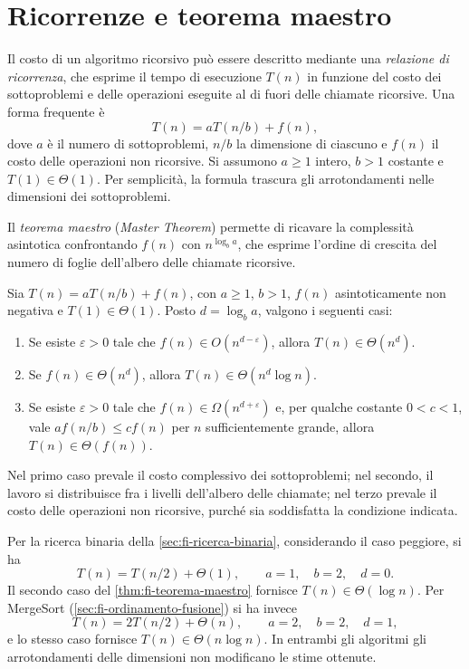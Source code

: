 \section{Ricorrenze e teorema maestro}
\label{sec:fi-teorema-maestro}

Il costo di un algoritmo ricorsivo può essere descritto mediante una
\emph{relazione di ricorrenza}, che esprime il tempo di esecuzione
\(T(n)\) in funzione del costo dei sottoproblemi e delle operazioni
eseguite al di fuori delle chiamate ricorsive. Una forma frequente è
\[
  T(n)=aT(n/b)+f(n),
\]
dove \(a\) è il numero di sottoproblemi, \(n/b\) la dimensione di
ciascuno e \(f(n)\) il costo delle operazioni non ricorsive.
Si assumono \(a\ge1\) intero, \(b>1\) costante e \(T(1)\in\Theta(1)\).
Per semplicità, la formula trascura gli arrotondamenti nelle dimensioni
dei sottoproblemi.

Il \emph{teorema maestro} (\emph{Master Theorem}) permette di
ricavare la complessità asintotica confrontando \(f(n)\) con
\(n^{\log_b a}\), che esprime l'ordine di crescita del numero
di foglie dell'albero delle chiamate ricorsive.

\begin{theorem}
\label{thm:fi-teorema-maestro}
Sia \(T(n)=aT(n/b)+f(n)\), con \(a\ge1\), \(b>1\),
\(f(n)\) asintoticamente non negativa e \(T(1)\in\Theta(1)\).
Posto \(d=\log_b a\), valgono i seguenti casi:
\begin{enumerate}
  \item Se esiste \(\varepsilon>0\) tale che
  \(f(n)\in O(n^{d-\varepsilon})\), allora
  \(T(n)\in\Theta(n^d)\).
  \item Se \(f(n)\in\Theta(n^d)\), allora
  \(T(n)\in\Theta(n^d\log n)\).
  \item Se esiste \(\varepsilon>0\) tale che
  \(f(n)\in\Omega(n^{d+\varepsilon})\) e, per qualche costante
  \(0<c<1\), vale \(af(n/b)\le cf(n)\) per \(n\) sufficientemente
  grande, allora \(T(n)\in\Theta(f(n))\).
\end{enumerate}
\end{theorem}

Nel primo caso prevale il costo complessivo dei sottoproblemi;
nel secondo, il lavoro si distribuisce fra i livelli dell'albero
delle chiamate; nel terzo prevale il costo delle operazioni non
ricorsive, purché sia soddisfatta la condizione indicata.

Per la ricerca binaria della \cref{sec:fi-ricerca-binaria},
considerando il caso peggiore, si ha
\[
  T(n)=T(n/2)+\Theta(1),
  \qquad a=1,\quad b=2,\quad d=0.
\]
Il secondo caso del \cref{thm:fi-teorema-maestro} fornisce
\(T(n)\in\Theta(\log n)\). Per MergeSort
(\cref{sec:fi-ordinamento-fusione}) si ha invece
\[
  T(n)=2T(n/2)+\Theta(n),
  \qquad a=2,\quad b=2,\quad d=1,
\]
e lo stesso caso fornisce \(T(n)\in\Theta(n\log n)\).
In entrambi gli algoritmi gli arrotondamenti delle dimensioni
non modificano le stime ottenute.

